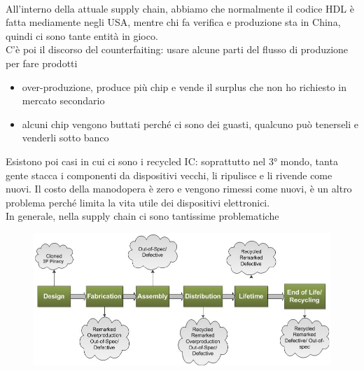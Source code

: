 \documentclass[oneside, 12pt]{extbook}
\begin{document}
\\All'interno della attuale supply chain, abbiamo che normalmente il codice HDL è fatta mediamente negli USA, mentre chi fa verifica e produzione sta in China, quindi ci sono tante entità in gioco.
\\C'è poi il discorso del counterfaiting: usare alcune parti del flusso di produzione per fare prodotti
\begin{itemize}
	\item over-produzione, produce più chip e vende il surplus che non ho richiesto in mercato secondario
	\item alcuni chip vengono buttati perché ci sono dei guasti, qualcuno può tenerseli e venderli sotto banco
\end{itemize}
Esistono poi casi in cui ci sono i recycled IC: soprattutto nel 3° mondo, tanta gente stacca i componenti da dispositivi vecchi, li ripulisce e li rivende come nuovi. Il costo della manodopera è zero e vengono rimessi come nuovi, è un altro problema perché limita la vita utile dei dispositivi elettronici.\\In generale, nella supply chain ci sono tantissime problematiche\\
\begin{figure}[!h]
	\includegraphics[scale=0.4]{immagini/hardware/chain_problems.png}
\end{figure}
\end{document}
